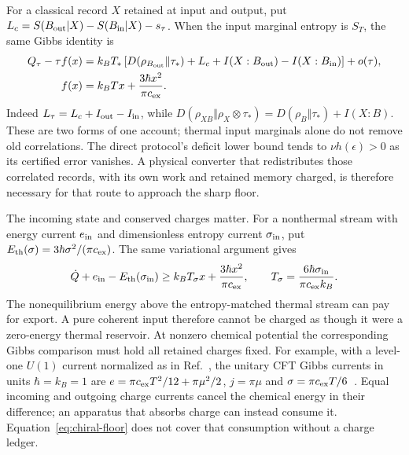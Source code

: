 For a classical record $X$ retained at input and output, put
$L_c=S(B_{\rm out}|X)-S(B_{\rm in}|X)-s_\tau$. When the input marginal
entropy is $S_T$, the same Gibbs identity is
\begin{equation}
 \begin{aligned}
 Q_\tau-\tau f(x)
 &=k_BT_*\left[D(\rho_{B_{\rm out}}\Vert\tau_*)+L_c
       +I(X:B_{\rm out})-I(X:B_{\rm in})\right]+o(\tau),\\
 f(x)&=k_BTx+\frac{3\hbar x^2}{\pi c_{\rm ex}}.
 \end{aligned}
 \label{eq:conditional-export-ledger}
\end{equation}
Indeed $L_\tau=L_c+I_{\rm out}-I_{\rm in}$, while
$D(\rho_{XB}\Vert\rho_X\otimes\tau_*)
=D(\rho_B\Vert\tau_*)+I(X:B)$. These are two forms of one account;
thermal input marginals alone do not remove old correlations.
The direct protocol's deficit lower bound tends to
$\nu h(\epsilon)>0$ as its certified error vanishes. A physical
converter that redistributes those correlated records, with its own
work and retained memory charged, is therefore necessary for that
route to approach the sharp floor.

The incoming state and conserved charges matter. For a nonthermal stream with
energy current $e_{\rm in}$ and dimensionless entropy current $\sigma_{\rm in}$,
put $E_{\rm th}(\sigma)=3\hbar\sigma^2/(\pi c_{\rm ex})$. The same variational
argument gives
\begin{equation}\label{eq:nonthermal-exhaust}
 \dot Q+e_{\rm in}-E_{\rm th}(\sigma_{\rm in})
 \ge k_BT_\sigma x+\frac{3\hbar x^2}{\pi c_{\rm ex}},
 \qquad T_\sigma=\frac{6\hbar\sigma_{\rm in}}{\pi c_{\rm ex}k_B}.
\end{equation}
The nonequilibrium energy above the entropy-matched thermal stream can pay for
export. A pure coherent input therefore cannot be charged as though it were a
zero-energy thermal reservoir. At nonzero chemical potential the corresponding
Gibbs comparison must hold all retained charges fixed. For example, with a
level-one $U(1)$ current normalized as in Ref.~\cite[Eq.~(84)]{BernardDoyon2015},
the unitary CFT Gibbs currents in units $\hbar=k_B=1$ are
$e=\pi c_{\rm ex}T^2/12+\pi\mu^2/2$, $j=\pi\mu$ and
$\sigma=\pi c_{\rm ex}T/6$~\cite[Eq.~(93)]{BernardDoyon2015}.
Equal incoming and outgoing charge currents cancel the chemical energy in their
difference; an apparatus that absorbs charge can instead consume it.
Equation~\eqref{eq:chiral-floor} does not cover that consumption without a charge
ledger.

